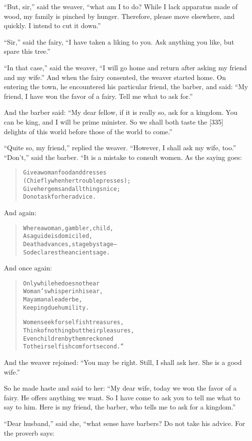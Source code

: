 \documentclass[article, twoside, 14pt]{memoir}
\renewenvironment{verbatim}{%
\begin{quote}%
\vskip -10pt%
\begin{alltt}\normalfont\large}{\end{alltt}%
\end{quote}%
\vskip -10pt
} %
\begin{document}
``But, sir,'' said the weaver,
``what am I to do? While I lack apparatus made of wood, my family is pinched by hunger. Therefore, please move elsewhere, and quickly. I intend to cut it down.''

``Sir,'' said the fairy,
``I have taken a liking to you. Ask anything you like, but spare this tree.''

``In that case,'' said the weaver,
``I will go home and return after asking my friend and my wife.''
And when the fairy consented, the weaver started home. On entering
the town, he encountered his particular friend, the barber, and
said:
``My friend, I have won the favor of a fairy. Tell me what to ask for.''

And the barber said:
``My dear fellow, if it is really so, ask for a kingdom. You can be king, and I will be prime minister. So we shall both taste the [335] delights of this world before those of the world to come.''

``Quite so, my friend,'' replied the weaver.
``However, I shall ask my wife, too.'' ``Don't,'' said the barber.
“It is a mistake to consult women. As the saying goes:

\begin{verbatim}
Give a woman food and dresses
(Chiefly when her trouble presses);
Give her gems and all things nice;
Do not ask for her advice.
\end{verbatim}
And again:

\begin{verbatim}
Where a woman, gambler, child,
As a guide is domiciled,
Death advances, stage by stage--
So declares the ancient sage.
\end{verbatim}
And once again:

\begin{verbatim}
Only while he does not hear
Woman's whisper in his ear,
May a man a leader be,
Keeping due humility.

Women seek for selfish treasures,
Think of nothing but their pleasures,
Even children by them reckoned
To their selfish comfort second.”
\end{verbatim}
And the weaver rejoined:
``You may be right. Still, I shall ask her. She is a good wife.''

So he made haste and said to her:
``My dear wife, today we won the favor of a fairy. He offers anything we want. So I have come to ask you to tell me what to say to him. Here is my friend, the barber, who tells me to ask for a kingdom.''

``Dear husband,'' said she, “what sense have barbers? Do not take
his advice. For the proverb says:
\end{document}
